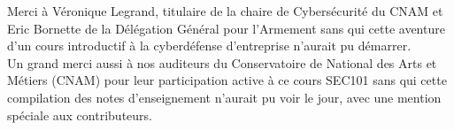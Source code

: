 

\newpage

\thispagestyle{empty}

\begin{center}

\Large{Merci à Véronique Legrand, titulaire de la chaire de Cybersécurité du CNAM et Eric Bornette de la Délégation Général pour l'Armement sans qui cette aventure d'un cours introductif à la cyberdéfense d'entreprise n'aurait pu démarrer. 
\\ 


Un grand merci aussi à nos auditeurs du Conservatoire de National des Arts et Métiers (CNAM) pour leur participation active à ce cours SEC101 sans qui cette compilation des notes d'enseignement n'aurait pu voir le jour, avec une mention spéciale aux contributeurs. 
}

\end{center}




\clearpage 


